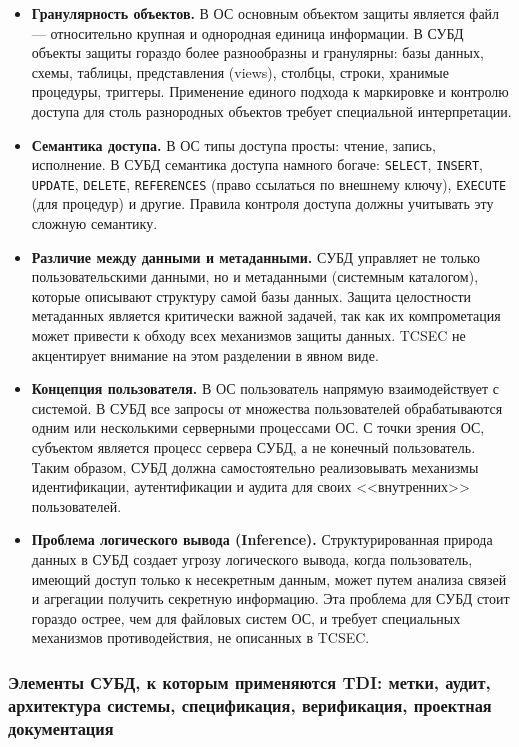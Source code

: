 \begin{itemize}
	\item \textbf{Гранулярность объектов.} В ОС основным объектом защиты является файл --- относительно крупная и однородная единица информации. В СУБД объекты защиты гораздо более разнообразны и гранулярны: базы данных, схемы, таблицы, представления (views), столбцы, строки, хранимые процедуры, триггеры. Применение единого подхода к маркировке и контролю доступа для столь разнородных объектов требует специальной интерпретации.
	\item \textbf{Семантика доступа.} В ОС типы доступа просты: чтение, запись, исполнение. В СУБД семантика доступа намного богаче: \texttt{SELECT}, \texttt{INSERT}, \texttt{UPDATE}, \texttt{DELETE}, \texttt{REFERENCES} (право ссылаться по внешнему ключу), \texttt{EXECUTE} (для процедур) и другие. Правила контроля доступа должны учитывать эту сложную семантику.
	\item \textbf{Различие между данными и метаданными.} СУБД управляет не только пользовательскими данными, но и метаданными (системным каталогом), которые описывают структуру самой базы данных. Защита целостности метаданных является критически важной задачей, так как их компрометация может привести к обходу всех механизмов защиты данных. TCSEC не акцентирует внимание на этом разделении в явном виде.
	\item \textbf{Концепция пользователя.} В ОС пользователь напрямую взаимодействует с системой. В СУБД все запросы от множества пользователей обрабатываются одним или несколькими серверными процессами ОС. С точки зрения ОС, субъектом является процесс сервера СУБД, а не конечный пользователь. Таким образом, СУБД должна самостоятельно реализовывать механизмы идентификации, аутентификации и аудита для своих <<внутренних>> пользователей.
	\item \textbf{Проблема логического вывода (Inference).} Структурированная природа данных в СУБД создает угрозу логического вывода, когда пользователь, имеющий доступ только к несекретным данным, может путем анализа связей и агрегации получить секретную информацию. Эта проблема для СУБД стоит гораздо острее, чем для файловых систем ОС, и требует специальных механизмов противодействия, не описанных в TCSEC.
\end{itemize}

\subsubsection{Элементы СУБД, к которым применяются TDI: метки, аудит, архитектура системы, спецификация, верификация, проектная документация}

